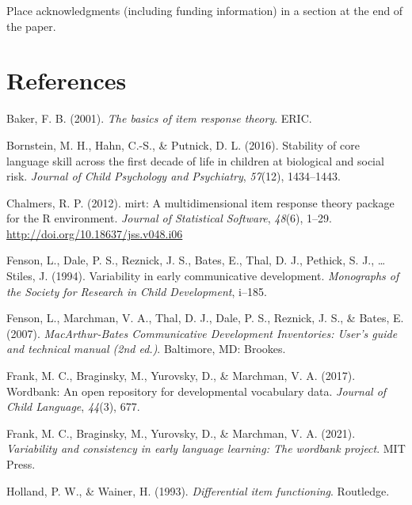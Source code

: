 \documentclass[10pt, letterpaper]{article}
\begin{document}
Place acknowledgments (including funding information) in a section at
the end of the paper.

\hypertarget{references}{%
\section{References}\label{references}}

\setlength{\parindent}{-0.1in} 
\setlength{\leftskip}{0.125in}

\noindent

\hypertarget{refs}{}
\leavevmode\hypertarget{ref-Baker2001}{}%
Baker, F. B. (2001). \emph{The basics of item response theory}. ERIC.

\leavevmode\hypertarget{ref-bornstein2016stability}{}%
Bornstein, M. H., Hahn, C.-S., \& Putnick, D. L. (2016). Stability of
core language skill across the first decade of life in children at
biological and social risk. \emph{Journal of Child Psychology and
Psychiatry}, \emph{57}(12), 1434--1443.

\leavevmode\hypertarget{ref-R-mirt}{}%
Chalmers, R. P. (2012). mirt: A multidimensional item response theory
package for the R environment. \emph{Journal of Statistical Software},
\emph{48}(6), 1--29. \url{http://doi.org/10.18637/jss.v048.i06}

\leavevmode\hypertarget{ref-fenson1994}{}%
Fenson, L., Dale, P. S., Reznick, J. S., Bates, E., Thal, D. J.,
Pethick, S. J., \ldots{} Stiles, J. (1994). Variability in early
communicative development. \emph{Monographs of the Society for Research
in Child Development}, i--185.

\leavevmode\hypertarget{ref-Fenson2007}{}%
Fenson, L., Marchman, V. A., Thal, D. J., Dale, P. S., Reznick, J. S.,
\& Bates, E. (2007). \emph{MacArthur-Bates Communicative Development
Inventories: User's guide and technical manual (2nd ed.)}. Baltimore,
MD: Brookes.

\leavevmode\hypertarget{ref-frank2017}{}%
Frank, M. C., Braginsky, M., Yurovsky, D., \& Marchman, V. A. (2017).
Wordbank: An open repository for developmental vocabulary data.
\emph{Journal of Child Language}, \emph{44}(3), 677.

\leavevmode\hypertarget{ref-frank2021}{}%
Frank, M. C., Braginsky, M., Yurovsky, D., \& Marchman, V. A. (2021).
\emph{Variability and consistency in early language learning: The
wordbank project}. MIT Press.

\leavevmode\hypertarget{ref-holland1993differential}{}%
Holland, P. W., \& Wainer, H. (1993). \emph{Differential item
functioning}. Routledge.
\end{document}
